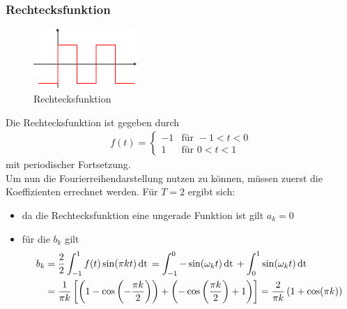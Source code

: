             \subsubsection*{Rechtecksfunktion}
        \begin{figure}
            \vspace{10pt}
            \centering
            \includegraphics[width=0.35\textwidth]{Abb/rechteck.pdf}
            \caption{Rechtecksfunktion}
            \vspace{10pt}
        \end{figure}
Die Rechtecksfunktion ist gegeben durch
        \begin{align*}
            f(t) = \begin{cases}
                -1 & \text{für } -1 < t < 0 \\
                 1 & \text{für }  0 < t < 1
            \end{cases}   
        \end{align*}
mit periodischer Fortsetzung.\\
Um nun die Fourierreihendarstellung nutzen zu können, müssen zuerst die Koeffizienten
errechnet werden. Für $T=2$ ergibt sich:
        \begin{itemize}
            \item da die Rechtecksfunktion eine ungerade Funktion ist gilt $a_k = 0$
            \item für die $b_k$ gilt
                \begin{align*}
                   b_k &=\frac{2}{2} \int_{-1}^{1} f(t) \sin(\pi k t ) \,\text{dt}\, = 
                   \int_{-1}^{0} - \sin(\omega_k t) \,\text{dt}\, 
                   + \int_0^1 \sin(\omega_k t ) \,\text{dt}\, \\
                   &= \frac{1}{\pi k} \left[
                       \left(1 - \cos
                        \left(-\frac{\pi k}{2}
                        \right)
                       \right)
                     + \left(-\cos
                        \left( \frac{\pi k}{2}
                        \right) + 1
                       \right)
                    \right]
                    = \frac{2}{\pi k} \left( 1 + \cos(\pi k)\right)
                \end{align*}
            \end{itemize}
